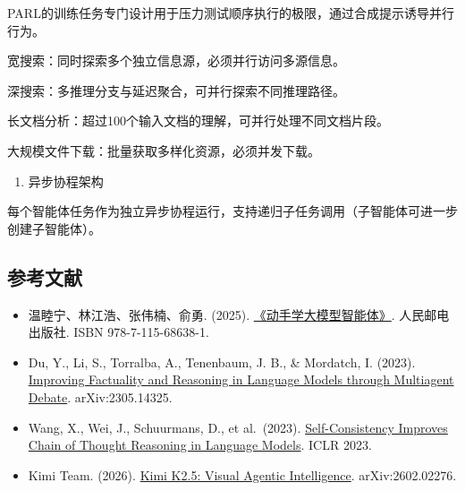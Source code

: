 PARL的训练任务专门设计用于压力测试顺序执行的极限，通过合成提示诱导并行行为。

宽搜索：同时探索多个独立信息源，必须并行访问多源信息。

深搜索：多推理分支与延迟聚合，可并行探索不同推理路径。

长文档分析：超过100个输入文档的理解，可并行处理不同文档片段。

大规模文件下载：批量获取多样化资源，必须并发下载。

\begin{enumerate}
\def\labelenumi{\arabic{enumi}.}
\setcounter{enumi}{4}
\tightlist
\item
  异步协程架构
\end{enumerate}

每个智能体任务作为独立异步协程运行，支持递归子任务调用（子智能体可进一步创建子智能体）。

\FloatBarrier
{}
\hypertarget{ux53c2ux8003ux6587ux732e-116}{%
\subsection{参考文献}\label{ux53c2ux8003ux6587ux732e-116}}

\vspace{0.25em}
\begin{itemize}
\tightlist
\item
  温睦宁、林江浩、张伟楠、俞勇. (2025). \href{https://haa.boyuai.com/}{《动手学大模型智能体》}. 人民邮电出版社. ISBN 978-7-115-68638-1.
\item
  Du, Y., Li, S., Torralba, A., Tenenbaum, J. B., \& Mordatch, I. (2023). \href{https://arxiv.org/abs/2305.14325}{Improving Factuality and Reasoning in Language Models through Multiagent Debate}. arXiv:2305.14325.
\item
  Wang, X., Wei, J., Schuurmans, D., et al.~(2023). \href{https://openreview.net/forum?id=1PL1NIMMrw}{Self-Consistency Improves Chain of Thought Reasoning in Language Models}. ICLR 2023.
\item
  Kimi Team. (2026). \href{https://arxiv.org/abs/2602.02276}{Kimi K2.5: Visual Agentic Intelligence}. arXiv:2602.02276.
\end{itemize}

\clearpage

